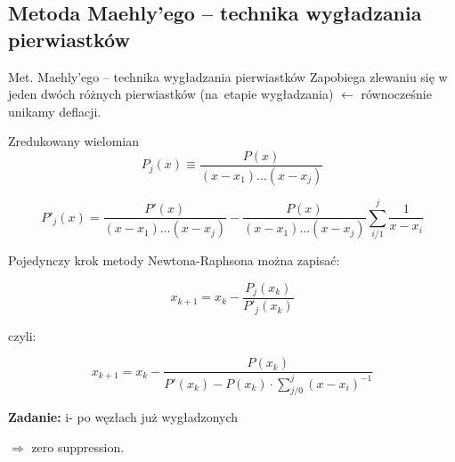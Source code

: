 \subsection{Metoda Maehly'ego -- technika wygładzania pierwiastków}

\begin{frame}{Met. Maehly'ego -- technika wygładzania pierwiastków}
  Zapobiega zlewaniu się w jeden dwóch różnych pierwiastków (na~etapie wygładzania) $\leftarrow$ równocześnie unikamy deflacji.

  \begin{block}{Zredukowany wielomian}
    $$P_j(x) \equiv \frac{P(x)}{(x - x_1)\ldots(x - x_j)}$$
  \end{block}
  
  $$P'_j(x) = \frac{P'(x)}{(x - x_1)\ldots(x - x_j)} - \frac{P(x)}{(x - x_1)\ldots(x - x_j)} \sum_{i/1}^j \frac{1}{x - x_i}$$ %
\end{frame}

\begin{frame}
  Pojedynczy krok metody Newtona-Raphsona można zapisać:

  $$x_{k+1} = x_k - \frac{P_j(x_k)}{P'_j(x_k)}$$

  czyli:

  $$x_{k+1} = x_k - \frac{P(x_k)}{P'(x_k) - P(x_k) \cdot \sum_{j/0}^j(x - x_i)^{-1}}$$ %

  \textbf{Zadanie:} i- po węzłach już wygładzonych %

  $\Rightarrow$ zero suppression.
\end{frame}
